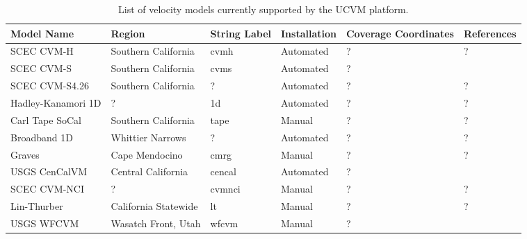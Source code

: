 
\begin{table*}
\centering
\small
\caption{List of velocity models currently supported by the UCVM platform.}
\begin{tabular}[]{lllllp{1.25in}}
\\
Model Name         & Region                & String Label & Installation & Coverage Coordinates & References \\
\hline
SCEC CVM-H         & Southern California   &   cvmh        &  Automated   & ?         & \citet{Plesch_2011_SCEC}     \newline
                                                                                        \citet{CVM-H_Manual}         \newline
                                                                                        ?                            \\
SCEC CVM-S         & Southern California   &   cvms        &  Automated   & ?         & \citet{Magistrale_1996_BSSA} \newline
                                                                                        \citet{Magistrale_2000_BSSA} \newline
                                                                                        \citet{Kohler_2003_BSSA}     \\
SCEC CVM-S4.26     & Southern California   &   ?           &  Automated   & ?         & ?                            \\
Hadley-Kanamori 1D & ?                     &   1d          &  Automated   & ?         & ?                            \\
Carl Tape SoCal    & Southern California   &   tape        &  Manual      & ?         & ?                            \\
Broadband 1D       & Whittier Narrows      &   ?           &  Automated   & ?         & ?                            \\
Graves             & Cape Mendocino        &   cmrg        &  Manual      & ?         & ?                            \\
USGS CenCalVM      & Central California    &   cencal      &  Automated   & ?         & \citet{Brocher_2005_Tech}    \newline
                                                                                        \citet{Brocher_2006_Proc}    \\
SCEC CVM-NCI       & ?                     &   cvmnci      &  Manual      & ?         & ?                            \\
Lin-Thurber        & California Statewide  &   lt          &  Manual      & ?         & ?                            \\
USGS WFCVM         & Wasatch Front, Utah   &   wfcvm       &  Manual      & ?         & \citet{Magistrale_2006_Tech} \\
\hline
\end{tabular}
\label{tab:cvms}
\end{table*}


